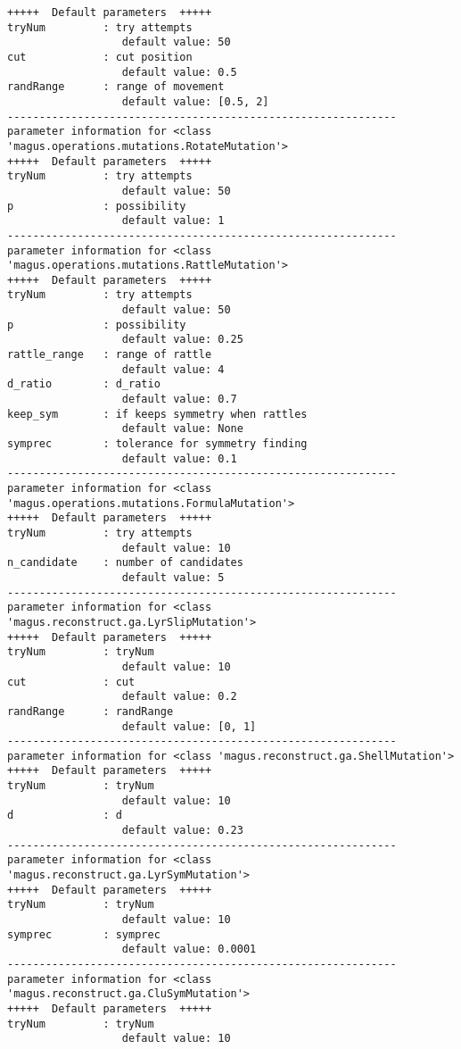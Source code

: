 \documentclass[12pt,oneside]{book}
\begin{document}
\begin{tcolorbox}
\begin{verbatim}
+++++  Default parameters  +++++
tryNum         : try attempts
                  default value: 50
cut            : cut position
                  default value: 0.5
randRange      : range of movement
                  default value: [0.5, 2]
-------------------------------------------------------------
parameter information for <class 'magus.operations.mutations.RotateMutation'>
+++++  Default parameters  +++++
tryNum         : try attempts
                  default value: 50
p              : possibility
                  default value: 1
-------------------------------------------------------------
parameter information for <class 'magus.operations.mutations.RattleMutation'>
+++++  Default parameters  +++++
tryNum         : try attempts
                  default value: 50
p              : possibility
                  default value: 0.25
rattle_range   : range of rattle
                  default value: 4
d_ratio        : d_ratio
                  default value: 0.7
keep_sym       : if keeps symmetry when rattles
                  default value: None
symprec        : tolerance for symmetry finding
                  default value: 0.1
-------------------------------------------------------------
parameter information for <class 'magus.operations.mutations.FormulaMutation'>
+++++  Default parameters  +++++
tryNum         : try attempts
                  default value: 10
n_candidate    : number of candidates
                  default value: 5
-------------------------------------------------------------
parameter information for <class 'magus.reconstruct.ga.LyrSlipMutation'>
+++++  Default parameters  +++++
tryNum         : tryNum
                  default value: 10
cut            : cut
                  default value: 0.2
randRange      : randRange
                  default value: [0, 1]
-------------------------------------------------------------
parameter information for <class 'magus.reconstruct.ga.ShellMutation'>
+++++  Default parameters  +++++
tryNum         : tryNum
                  default value: 10
d              : d
                  default value: 0.23
-------------------------------------------------------------
parameter information for <class 'magus.reconstruct.ga.LyrSymMutation'>
+++++  Default parameters  +++++
tryNum         : tryNum
                  default value: 10
symprec        : symprec
                  default value: 0.0001
-------------------------------------------------------------
parameter information for <class 'magus.reconstruct.ga.CluSymMutation'>
+++++  Default parameters  +++++
tryNum         : tryNum
                  default value: 10

\end{verbatim}
\end{tcolorbox}
\end{document}

